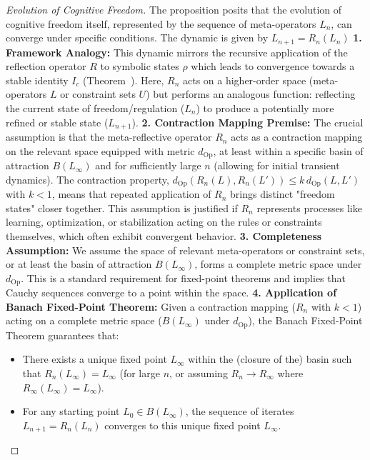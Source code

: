 \begin{proof}[Evolution of Cognitive Freedom]
\label{proof:bk9_evolution_of_cognitive_freedom}
The proposition posits that the evolution of cognitive freedom itself, represented by the sequence of meta-operators $L_n$, can converge under specific conditions. The dynamic is given by $L_{n+1} = R_n(L_n)$ %
\textbf{1. Framework Analogy:}
This dynamic mirrors the recursive application of the reflection operator $R$ to symbolic states $\rho$ which leads to convergence towards a stable identity $I_c$ (Theorem~). Here, $R_n$ acts on a higher-order space (meta-operators $L$ or constraint sets $U$) but performs an analogous function: reflecting the current state of freedom/regulation ($L_n$) to produce a potentially more refined or stable state ($L_{n+1}$).
\textbf{2. Contraction Mapping Premise:}
The crucial assumption is that the meta-reflective operator $R_n$ acts as a contraction mapping on the relevant space equipped with metric $d_{\text{Op}}$, at least within a specific basin of attraction $B(L_\infty)$ and for sufficiently large $n$ (allowing for initial transient dynamics). The contraction property, $d_{\text{Op}}(R_n(L), R_n(L')) \le k \, d_{\text{Op}}(L, L')$ with $k < 1$, means that repeated application of $R_n$ brings distinct "freedom states" closer together. This assumption is justified if $R_n$ represents processes like learning, optimization, or stabilization acting on the rules or constraints themselves, which often exhibit convergent behavior.
\textbf{3. Completeness Assumption:}
We assume the space of relevant meta-operators or constraint sets, or at least the basin of attraction $B(L_\infty)$, forms a complete metric space under $d_{\text{Op}}$. This is a standard requirement for fixed-point theorems and implies that Cauchy sequences converge to a point within the space.
\textbf{4. Application of Banach Fixed-Point Theorem:}
Given a contraction mapping ($R_n$ with $k<1$) acting on a complete metric space ($B(L_\infty)$ under $d_{\text{Op}}$), the Banach Fixed-Point Theorem guarantees that:
\begin{itemize}
    \item There exists a unique fixed point $L_\infty$ within the (closure of the) basin such that $R_n(L_\infty) = L_\infty$ (for large $n$, or assuming $R_n \to R_\infty$ where $R_\infty(L_\infty) = L_\infty$).
    \item For any starting point $L_0 \in B(L_\infty)$, the sequence of iterates $L_{n+1} = R_n(L_n)$ converges to this unique fixed point $L_\infty$.

\end{itemize}
\end{proof}
